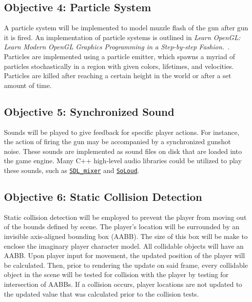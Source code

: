 \documentclass {article}
\begin{document}

\subsection{Objective 4: Particle System}
A particle system will be implemented to model muzzle flash of the gun after gun it is fired. An implementation of particle systems is outlined in \textit{Learn OpenGL: Learn Modern OpenGL Graphics Programming in a Step-by-step Fashion.}~\cite{learnopengl}. Particles are implemented using a particle emitter, which spawns a myriad of particles stochastically in a region with given colors, lifetimes, and velocities. Particles are killed after reaching a certain height in the world or after a set amount of time.


\subsection{Objective 5: Synchronized Sound}
Sounds will be played to give feedback for specific player actions. For instance, the action of firing the gun may be accompanied by a synchronized gunshot noise. These sounds are implemented as sound files on disk that are loaded into the game engine. Many C++ high-level audio libraries could be utilized to play these sounds, such as \href{https://github.com/libsdl-org/SDL\_mixer}{\texttt{SDL\_mixer}} and \href{https://solhsa.com/soloud/}{\texttt{SoLoud}}.

\subsection{Objective 6: Static Collision Detection}
Static collision detection will be employed to prevent the player from moving out of the bounds defined by scene. The player's location will be surrounded by an invisible axis-aligned bounding box (AABB). The size of this box will be make to enclose the imaginary player character model. All collidable objects will have an AABB. Upon player input for movement, the updated position of the player will be calculated. Then, prior to rendering the update on said frame, every collidable object in the scene will be tested for collision with the player by testing for intersection of AABBs. If a collision occurs, player locations are not updated to the updated value that was calculated prior to the collision tests.
\end{document}
